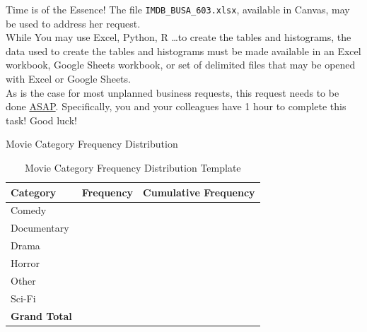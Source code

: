 \documentclass[pdf]{beamer}
\theoremstyle{remark}
\theoremstyle{definition}
\begin{document}
\begin{frame}[t]{Time is of the Essence!}
The file \texttt{IMDB\_BUSA\_603.xlsx}, available in Canvas, may be used to address her request. \\
\vspace{1.5ex} While You may use Excel, Python, R \ldots to create the tables and histograms, the data used to create the tables and histograms must be made available in an Excel workbook, Google Sheets workbook, or set of delimited files that may be opened with Excel or Google Sheets.\\
\vspace{1.5ex}
 As is the case for most unplanned business requests, this request needs to be done \underline{ASAP}. Specifically, you and your colleagues have 1 hour to complete this task!   Good luck!
\end{frame}

\begin{frame}[t]{Movie Category Frequency Distribution}
\begin{table}[htbp]
  \centering
  \captionsetup{justification=centering}
    \begin{tabular}{lrr}
    \rowcolor[rgb]{ .851,  .882,  .949} \textbf{Category} & \multicolumn{1}{l}{\textbf{Frequency}} & \multicolumn{1}{l}{\textbf{Cumulative Frequency}}\\
    \midrule
    Comedy &  &  \\
    Documentary &  &  \\
    Drama &  &  \\
    Horror &  &  \\
    Other &  & \\
    Sci-Fi &  & \\
    \midrule
    \rowcolor[rgb]{ .851,  .882,  .949} \textbf{Grand Total} &  & \\
    \end{tabular}%
     \caption{Movie Category Frequency Distribution Template}
  \label{tab:1}%
\end{table}%
\end{frame}
\end{document}
